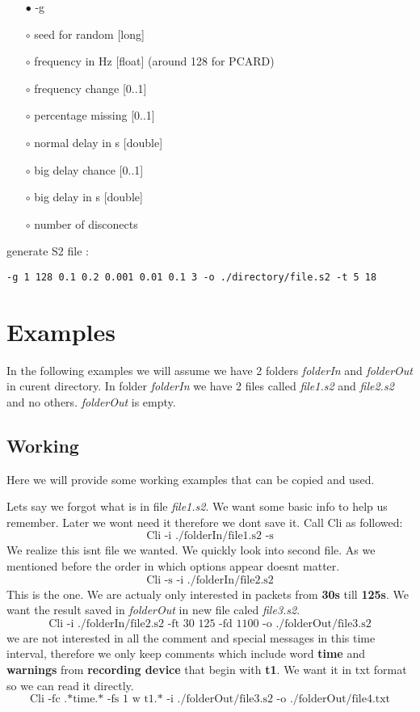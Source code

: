 \documentclass[english]{article}
\begin{document}
\begin{itemize}
\item[$\bullet$] -g
\item[$\circ$] seed for random [long]
\item[$\circ$] frequency in Hz [float] (around 128 for PCARD)
\item[$\circ$] frequency change [0..1]
\item[$\circ$] percentage missing [0..1]
\item[$\circ$] normal delay in s [double]
\item[$\circ$] big delay chance [0..1]
\item[$\circ$] big delay in s [double]
\item[$\circ$] number of disconects

\end{itemize}
generate S2 file : 
\begin{lstlisting} 
-g 1 128 0.1 0.2 0.001 0.01 0.1 3 -o ./directory/file.s2 -t 5 18
\end{lstlisting}


\section{Examples}

In the following examples we will assume we have 2 folders \textit{folderIn} and \textit{folderOut} in curent directory. In folder \textit{folderIn} we have 2 files called \textit{file1.s2} and \textit{file2.s2} and no others. \textit{folderOut} is empty.

\subsection{Working}
Here we will provide some working examples that can be copied and used. 

Lets say we forgot what is in file \textit{file1.s2}. We want some basic info to help us remember. Later we wont need it therefore we dont save it. Call Cli as followed:
$$\text{Cli -i ./folderIn/file1.s2 -s}$$
We realize this isnt file we wanted. We quickly look into second file. As we mentioned before the order in which options appear doesnt matter.
$$\text{Cli -s -i ./folderIn/file2.s2}$$
This is the one. We are actualy only interested in packets from \textbf{30s} till \textbf{125s}. We want the result saved in \textit{folderOut} in new file caled \textit{file3.s2}.
$$\text{Cli -i ./folderIn/file2.s2 -ft 30 125 -fd 1100 -o ./folderOut/file3.s2}$$
we are not interested in all the comment and special messages in this time interval, therefore we only keep comments which include word \textbf{time} and \textbf{warnings} from \textbf{recording device} that begin with \textbf{t1}. We want it in txt format so we can read it directly.
$$\text{Cli -fc .*time.* -fs 1 w t1.* -i ./folderOut/file3.s2 -o ./folderOut/file4.txt}$$
\end{document}
